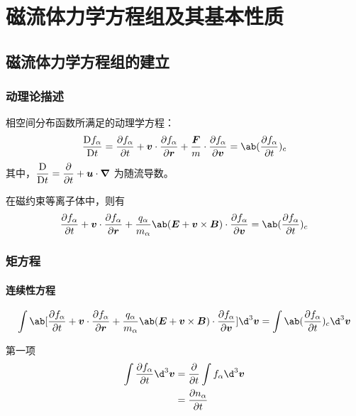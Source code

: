 
\chapter{磁流体力学方程组及其基本性质}

\section{磁流体力学方程组的建立}

\subsection{动理论描述}

相空间分布函数所满足的动理学方程：
\begin{equation}
    \mdv{f_\alpha}{t} = \pdv{f_\alpha}{t} + \vec{v} \cdot \pdv{f_\alpha}{\vec{r}} + \frac{\vec{F}}{m} \cdot \pdv{f_\alpha}{\vec{v}} = \ab( \pdv{f_\alpha}{t} )_c
\end{equation}
其中，$\displaystyle\mdv{}{t} = \displaystyle\pdv{}{t} + \vec{u} \cdot \grad$ 为随流导数。

在磁约束等离子体中，则有
\begin{equation}
    \pdv{f_\alpha}{t} + \vec{v} \cdot \pdv{f_\alpha}{\vec{r}} + \frac{q_\alpha}{m_\alpha} \ab( \vec{E} + \vec{v} \times \vec{B} ) \cdot \pdv{f_\alpha}{\vec{v}} = \ab( \pdv{f_\alpha}{t} )_c
\end{equation}

\subsection{矩方程}

\subsubsection{连续性方程}

\begin{equation}
    \int \ab[
        \pdv{f_\alpha}{t} + \vec{v} \cdot \pdv{f_\alpha}{\vec{r}} + \frac{q_\alpha}{m_\alpha} \ab( \vec{E} + \vec{v} \times \vec{B} ) \cdot \pdv{f_\alpha}{\vec{v}}
    ] \d^3 \vec{v}
    = \int \ab( \pdv{f_\alpha}{t} )_c \d^3 \vec{v}
\end{equation}

第一项
\begin{equation}\begin{aligned}
    \int \pdv{f_\alpha}{t} \d^3 \vec{v}
    &= \pdv{}{t} \int f_\alpha \d^3 \vec{v} \\
    &= \pdv{n_\alpha}{t}
\end{aligned}\end{equation}

